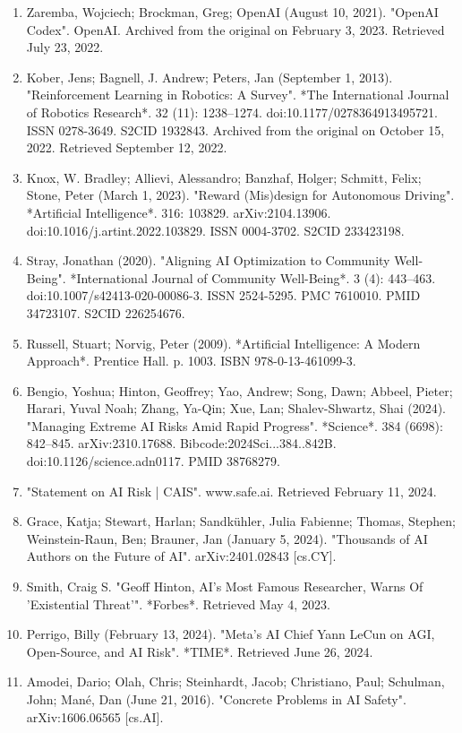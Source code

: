 \begin{enumerate}
\item Zaremba, Wojciech; Brockman, Greg; OpenAI (August 10, 2021). "OpenAI Codex". OpenAI. Archived from the original on February 3, 2023. Retrieved July 23, 2022.
\item Kober, Jens; Bagnell, J. Andrew; Peters, Jan (September 1, 2013). "Reinforcement Learning in Robotics: A Survey". *The International Journal of Robotics Research*. 32 (11): 1238–1274. doi:10.1177/0278364913495721. ISSN 0278-3649. S2CID 1932843. Archived from the original on October 15, 2022. Retrieved September 12, 2022.
\item Knox, W. Bradley; Allievi, Alessandro; Banzhaf, Holger; Schmitt, Felix; Stone, Peter (March 1, 2023). "Reward (Mis)design for Autonomous Driving". *Artificial Intelligence*. 316: 103829. arXiv:2104.13906. doi:10.1016/j.artint.2022.103829. ISSN 0004-3702. S2CID 233423198.
\item Stray, Jonathan (2020). "Aligning AI Optimization to Community Well-Being". *International Journal of Community Well-Being*. 3 (4): 443–463. doi:10.1007/s42413-020-00086-3. ISSN 2524-5295. PMC 7610010. PMID 34723107. S2CID 226254676.
\item Russell, Stuart; Norvig, Peter (2009). *Artificial Intelligence: A Modern Approach*. Prentice Hall. p. 1003. ISBN 978-0-13-461099-3.
\item Bengio, Yoshua; Hinton, Geoffrey; Yao, Andrew; Song, Dawn; Abbeel, Pieter; Harari, Yuval Noah; Zhang, Ya-Qin; Xue, Lan; Shalev-Shwartz, Shai (2024). "Managing Extreme AI Risks Amid Rapid Progress". *Science*. 384 (6698): 842–845. arXiv:2310.17688. Bibcode:2024Sci...384..842B. doi:10.1126/science.adn0117. PMID 38768279.
\item "Statement on AI Risk | CAIS". www.safe.ai. Retrieved February 11, 2024.
\item Grace, Katja; Stewart, Harlan; Sandkühler, Julia Fabienne; Thomas, Stephen; Weinstein-Raun, Ben; Brauner, Jan (January 5, 2024). "Thousands of AI Authors on the Future of AI". arXiv:2401.02843 [cs.CY].
\item Smith, Craig S. "Geoff Hinton, AI's Most Famous Researcher, Warns Of 'Existential Threat'". *Forbes*. Retrieved May 4, 2023.
\item Perrigo, Billy (February 13, 2024). "Meta's AI Chief Yann LeCun on AGI, Open-Source, and AI Risk". *TIME*. Retrieved June 26, 2024.
\item Amodei, Dario; Olah, Chris; Steinhardt, Jacob; Christiano, Paul; Schulman, John; Mané, Dan (June 21, 2016). "Concrete Problems in AI Safety". arXiv:1606.06565 [cs.AI].

\end{enumerate}
